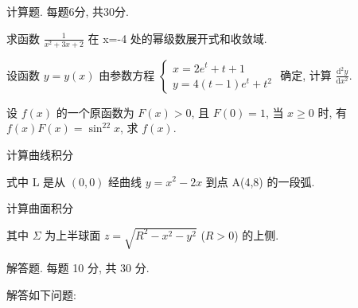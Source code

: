 \par{}
计算题. 每题6分, 共30分.\par
求函数  $\frac{1}{x^{2}+3x+2}$  在 x=-4 处的幂级数展开式和收敛域.\par
设函数 $y = y(x)$ 由参数方程 $\left\{ \begin{array}{l} x = 2e^{t} + t + 1 \\ y = 4(t - 1)e^{t} + t^{2} \end{array} \right.$ 确定, 计算 $\frac{\mathrm{d}^2y}{\mathrm{d}x^2}$.\par
设 $f(x)$ 的一个原函数为 $F(x) > 0$, 且 $F(0) = 1$, 当 $x \geq 0$ 时, 有 $f(x)F(x) = \sin^22x$, 求 $f(x)$.\par
\par{}
计算曲线积分\par
\nopagebreak[4]
式中 L 是从  $(0,0)$  经曲线  $y = x^{2} - 2x$  到点 A(4,8) 的一段弧.\par
\par{}
计算曲面积分\par
\nopagebreak[4]
其中 $\Sigma$ 为上半球面 $z = \sqrt{R^2 - x^2 - y^2}$ ($R > 0$) 的上侧.\par
\par{}
解答题. 每题 10 分, 共 30 分.\par
解答如下问题:\par
